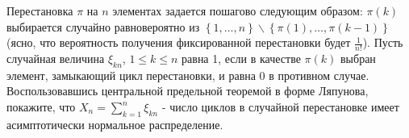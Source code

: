 \begin{comment}
\begin{problem}

На множестве $n!$ перестановок $n$ различных элементов задано равномерное распределение. Обозначим через $\xi_k$ случайную величину, 
равную числу инверсий, образованных элементом с номером $k$, т.е. равную числу элементов с номерами меньшими чем $k$, 
которые стоят в перестановке правее элемента с номером $k$. Покажите, что 
$$
\frac{\sum\limits_{k=1}^{n}\xi_k -\left.n^2\right/4}{\left.n^{3/2}\right/6}\xrightarrow{d} N(0,1) \quad \text{ при } n\to\infty . 
$$
\end{problem}


\begin{ordre}

$ $

\begin{enumerate}

\item
 Введем с.в. 
$$
\xi_{k,i}={\mathcal I}(\text{<<$k$ находится левее числа $i$>>}) . 
$$

Тогда 
$$
\xi_k=\xi_{k,1}+\xi_{k,2}+\ldots +\xi_{k,k-1}, 
$$

Покажите, что
$${\mathbb E}\xi_k=\left.(k-1)\right/2$$,

$$
{\mathbb E}\xi_k^2={\mathbb E}\xi_{k,1}^2+\ldots+{\mathbb E}\xi_{k,k-1}^2+2\sum\limits_{i<j<k}{\mathbb E}(\xi_{k,i}\xi_{k,j})=
$$
$$
=\frac{k-1}{2}+2\cdot\frac{(k-1)(k-2)}{2}\cdot\frac{1}{3}=\frac{2k^2-3k+1}{6} , 
$$


с.в. $\xi_k$ и $\xi_m$ некоррелированы, $k\ne m$. 


\item 
Для всякой сл.в. $X_k=\xi_k-{\mathbb E}\xi_k$ характеристическая функция имеет вид 
\[
\varphi_{X_k}(t)=1-\frac{t^2 \Var\xi_k}{2}+{\overline o}(t^2)
\]

\end{enumerate}
\end{ordre}
\end{comment}

\begin{problem}

Перестановка $\pi $ на $n$ элементах задается пошагово следующим образом: $\pi (k)$ выбирается случайно равновероятно из $\left\{1,\ldots ,n\right\}\backslash \left\{\pi (1),\ldots ,\pi (k-1)\right\}$ (ясно, что вероятность получения фиксированной перестановки будет $\frac{1}{n!} $). Пусть случайная величина $\xi _{kn} $, $1\le k\le n$ равна 1, если в качестве $\pi (k)$ выбран элемент, замыкающий цикл перестановки, и равна 0 в противном случае. Воспользовавшись центральной предельной теоремой в форме Ляпунова, покажите, что $X_{n} =\sum _{k=1}^{n}\xi _{kn}  $ - число циклов в случайной перестановке имеет асимптотически нормальное распределение.
\end{problem}


